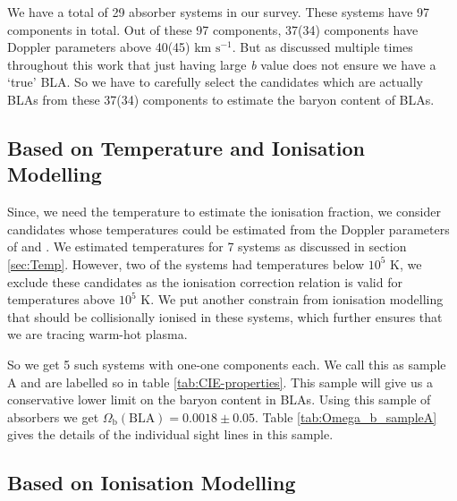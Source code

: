 We have a total of 29 absorber systems in our survey. These systems have 97  components in total. Out of these 97 components, 37(34) components have Doppler parameters above 40(45) km $\text{s}^{-1}$. But as discussed multiple times throughout this work that just having large \emph{b} value does not ensure we have a `true' BLA. So we have to carefully select the candidates which are actually BLAs from these 37(34) components to estimate the baryon content of BLAs. 

\subsection{Based on Temperature and Ionisation Modelling}  \label{sec:sampleA}

Since, we need the temperature to estimate the ionisation fraction, we consider candidates whose temperatures could be estimated from the Doppler parameters of  and . We estimated temperatures for 7 systems as discussed in section \ref{sec:Temp}. However, two of the systems had temperatures below $10^5$ K, we exclude these candidates as the ionisation correction relation is valid for temperatures above $10^5$ K. We put another constrain from ionisation modelling that  should be collisionally ionised in these systems, which further ensures that we are tracing warm-hot plasma. 

So we get 5 such systems with one-one components each. We call this as sample A and are labelled so in table \ref{tab:CIE-properties}. This sample will give us a conservative lower limit on the baryon content in BLAs. Using this sample of absorbers we get $\Omega_\text{b}(\text{BLA})=0.0018 \pm 0.05$. Table \ref{tab:Omega_b_sampleA} gives the details of the individual sight lines in this sample.  


\subsection{Based on Ionisation Modelling} \label{sec:sampleB}

